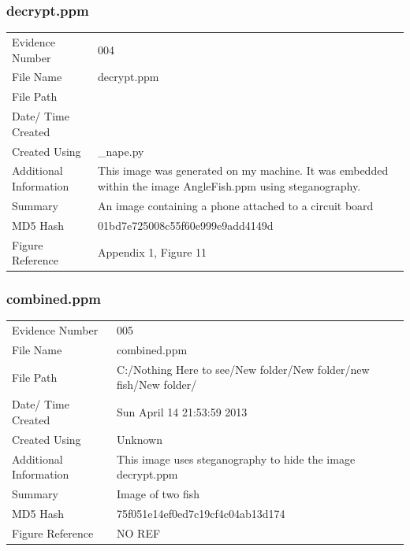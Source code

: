 \documentclass[12pt]{article}
\begin{document}
				\subsubsection{decrypt.ppm}
					\begin{tabular}{l | p{8cm}}
						Evidence Number & 004  \\
			    			File Name & decrypt.ppm \\
			      			File Path & \\
						Date/ Time Created & \\
						Created Using & \_nape.py \\
						Additional Information & This image was generated on my machine. It was embedded within the image AngleFish.ppm using steganography.\\
						Summary & An image containing a phone attached to a circuit board \\
						MD5 Hash & 01bd7e725008c55f60e999e9add4149d \\
						Figure Reference &  Appendix 1, Figure 11\\
					\end{tabular}

				\subsubsection{combined.ppm}
					\begin{tabular}{l | p{8cm}}
						Evidence Number & 005  \\
			    			File Name & combined.ppm \\
			      			File Path & C:/Nothing Here to see/New folder/New folder/new fish/New folder/\\
						Date/ Time Created & Sun April 14 21:53:59 2013\\
						Created Using & Unknown \\
						Additional Information & This image uses steganography to hide the image decrypt.ppm\\
						Summary & Image of two fish\\
						MD5 Hash & 75f051e14ef0ed7c19cf4c04ab13d174 \\
						Figure Reference &  NO REF\\
					\end{tabular}
					
\end{document}
